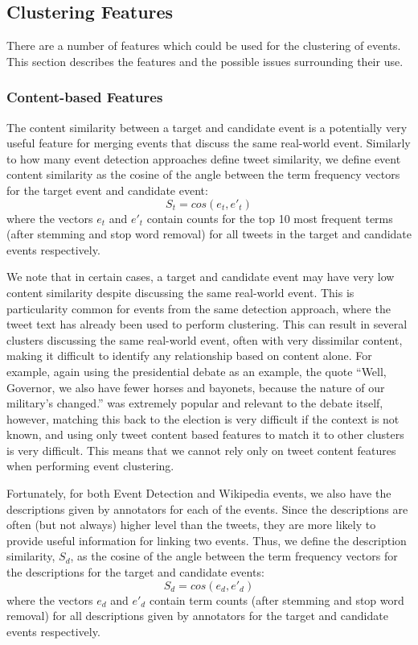 
\subsection{Clustering Features}
\label{collection:clustering}
There are a number of features which could be used for the clustering of events.
This section describes the features and the possible issues surrounding their use.

\subsubsection{Content-based Features}
The content similarity between a target and candidate event is a potentially very useful feature for merging events that discuss the same real-world event.
Similarly to how many event detection approaches define tweet similarity, we define event content similarity as the cosine of the angle between the term frequency vectors for the target event and candidate event:
\begin{displaymath}
	S_t = cos(e_t, e'_t)
\end{displaymath}
where the vectors $e_t$ and $e'_t$ contain counts for the top 10 most frequent terms (after stemming and stop word removal) for all tweets in the target and candidate events respectively.

We note that in certain cases, a target and candidate event may have very low content similarity despite discussing the same real-world event.
This is particularity common for events from the same detection approach, where the tweet text has already been used to perform clustering.
This can result in several clusters discussing the same real-world event, often with very dissimilar content, making it difficult to identify any relationship based on content alone.
For example, again using the presidential debate as an example, the quote ``Well, Governor, we also have fewer horses and bayonets, because the nature of our military's changed.'' was extremely popular and relevant to the debate itself, however, matching this back to the election is very difficult if the context is not known, and using only tweet content based features to match it to other clusters is very difficult.
This means that we cannot rely only on tweet content features when performing event clustering.

Fortunately, for both Event Detection and Wikipedia events, we also have the  descriptions given by annotators for each of the events.
Since the descriptions are often (but not always) higher level than the tweets, they are more likely to provide useful information for linking two events.
Thus, we define the description similarity, $S_d$, as the cosine of the angle between the term frequency vectors for the descriptions for the target and candidate events:
\begin{displaymath}
	S_d = cos(e_d, e'_d)
\end{displaymath}
where the vectors $e_d$ and $e'_d$ contain term counts (after stemming and stop word removal) for all descriptions given by annotators for the target and candidate events respectively.

